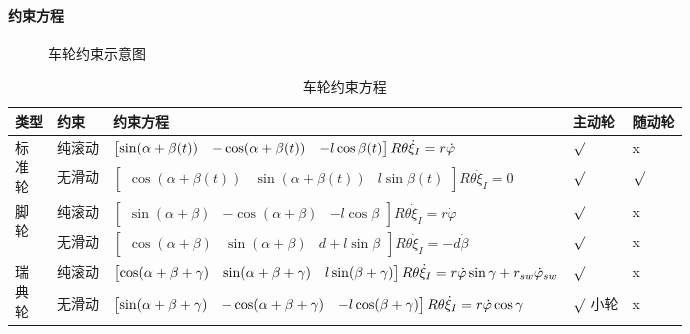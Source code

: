 \documentclass[
12pt, %
a4paper, 
oneside, %
headinclude,footinclude, %
]{scrartcl}
\begin{document}
\paragraph{约束方程}
\begin{figure}[H]
\centering
{} \quad
{} \quad
{}
\caption{车轮约束示意图}
\end{figure}

\begin{table}[H]
\centering
\begin{tabular}{|p{0.9cm}|p{1.3cm}|p{10cm}|p{1.4cm}|p{1.3cm}|}
\hline
类型 & 约束 & 约束方程 & 主动轮 & 随动轮 \\
\hline
\multirow{2}{*}{\parbox[c]{0.9cm}{标\\准\\轮}} & 纯滚动 & $ \begin{bmatrix} \sin(\alpha + \beta(t)) & -\cos(\alpha + \beta(t)) & -l\cos\beta(t) \end{bmatrix} R\theta \dot{\xi}_I \newline = r\dot{\varphi} $ & $ \surd $ & x \\
\cline{2-5}
& 无滑动 & $ \begin{bmatrix} \cos(\alpha + \beta(t)) & \sin(\alpha + \beta(t)) & l\sin\beta(t) \end{bmatrix} R\theta \dot{\xi}_I = 0 $ & $ \surd $ & $ \surd $ \\
\hline
\multirow{2}{*}{\parbox[c]{0.9cm}{脚\\轮}} & 纯滚动 & $ \begin{bmatrix} \sin(\alpha + \beta) & -\cos(\alpha + \beta) & -l\cos\beta \end{bmatrix} R\theta \dot{\xi}_I = r\dot{\varphi} $ & $ \surd $ & x \\
\cline{2-5}
& 无滑动 & $ \begin{bmatrix} \cos(\alpha + \beta) & \sin(\alpha + \beta) & d + l\sin\beta \end{bmatrix} R\theta \dot{\xi}_I = -d\dot{\beta} $ & $ \surd $ & x \\
\hline
\multirow{2}{*}{\parbox[c]{0.9cm}{瑞\\典\\轮}} & 纯滚动 & $ \begin{bmatrix} \cos(\alpha + \beta + \gamma) & \sin(\alpha + \beta + \gamma) & l\sin(\beta + \gamma) \end{bmatrix} R\theta \dot{\xi}_I \newline = r\dot{\varphi}\sin\gamma + r_{sw}\dot{\varphi}_{sw} $ & $ \surd $ & x \\
\cline{2-5}
& 无滑动 & $ \begin{bmatrix} \sin(\alpha + \beta + \gamma) & -\cos(\alpha + \beta + \gamma) & -l\cos(\beta + \gamma) \end{bmatrix} R\theta \dot{\xi}_I \newline = r\dot{\varphi}\cos\gamma $ & $ \surd $ \newline 小轮 & x \\
\hline
\end{tabular}
\caption{车轮约束方程}
\end{table}
\end{document}
